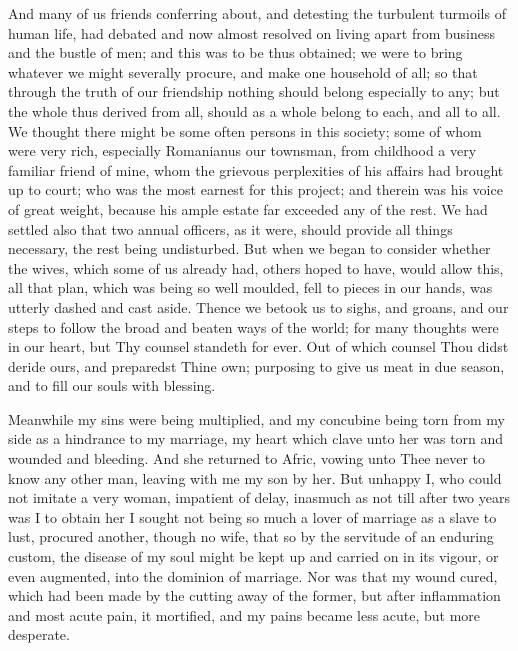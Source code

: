 \documentclass[b5paper,openright,12pt,twoside]{book}
\begin{document}
And many of us friends conferring about, and detesting the turbulent
turmoils of human life, had debated and now almost resolved on living
apart from business and the bustle of men; and this was to be thus
obtained; we were to bring whatever we might severally procure, and
make one household of all; so that through the truth of our friendship
nothing should belong especially to any; but the whole thus derived from
all, should as a whole belong to each, and all to all. We thought there
might be some often persons in this society; some of whom were very
rich, especially Romanianus our townsman, from childhood a very familiar
friend of mine, whom the grievous perplexities of his affairs had
brought up to court; who was the most earnest for this project; and
therein was his voice of great weight, because his ample estate far
exceeded any of the rest. We had settled also that two annual officers,
as it were, should provide all things necessary, the rest being
undisturbed. But when we began to consider whether the wives, which
some of us already had, others hoped to have, would allow this, all that
plan, which was being so well moulded, fell to pieces in our hands, was
utterly dashed and cast aside. Thence we betook us to sighs, and groans,
and our steps to follow the broad and beaten ways of the world; for many
thoughts were in our heart, but Thy counsel standeth for ever. Out
of which counsel Thou didst deride ours, and preparedst Thine own;
purposing to give us meat in due season, and to fill our souls with
blessing.

Meanwhile my sins were being multiplied, and my concubine being torn
from my side as a hindrance to my marriage, my heart which clave unto
her was torn and wounded and bleeding. And she returned to Afric, vowing
unto Thee never to know any other man, leaving with me my son by her.
But unhappy I, who could not imitate a very woman, impatient of delay,
inasmuch as not till after two years was I to obtain her I sought not
being so much a lover of marriage as a slave to lust, procured another,
though no wife, that so by the servitude of an enduring custom, the
disease of my soul might be kept up and carried on in its vigour, or
even augmented, into the dominion of marriage. Nor was that my wound
cured, which had been made by the cutting away of the former, but after
inflammation and most acute pain, it mortified, and my pains became less
acute, but more desperate.
\end{document}
